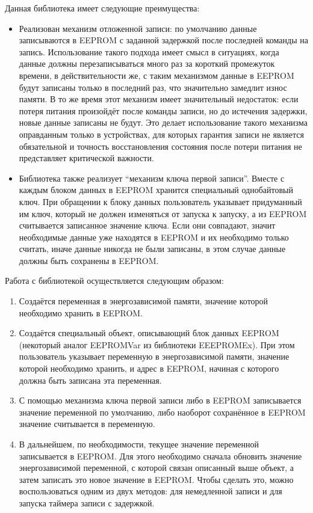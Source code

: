 Данная библиотека имеет следующие преимущества:
\begin{itemize}
	\item Реализован механизм отложенной записи: по умолчанию данные записываются в EEPROM с заданной задержкой после последней команды на запись. Использование такого подхода имеет смысл в ситуациях, когда данные должны перезаписываться много раз за короткий промежуток времени, в действительности же, с таким механизмом данные в EEPROM будут записаны только в последний раз, что значительно замедлит износ памяти. В то же время этот механизм имеет значительный недостаток: если потеря питания произойдёт после команды записи, но до истечения задержки, новые данные записаны не будут. Это делает использование такого механизма оправданным только в устройствах, для которых гарантия записи не является обязательной и точность восстановления состояния после потери питания не представляет критической важности.
	\item Библиотека также реализует "`механизм ключа первой записи"'. Вместе с каждым блоком данных в EEPROM хранится специальный однобайтовый ключ. При обращении к блоку данных пользователь указывает придуманный им ключ, который не должен изменяться от запуска к запуску, а из EEPROM считывается записанное значение ключа. Если они совпадают, значит необходимые данные уже находятся в EEPROM и их необходимо только считать, иначе данные никогда не были записаны, в этом случае данные должны быть сохранены в EEPROM.
\end{itemize}

Работа с библиотекой осуществляется следующим образом:
\begin{enumerate}
	\item Создаётся переменная в энергозависимой памяти, значение которой необходимо хранить в EEPROM.
	\item Создаётся специальный объект, описывающий блок данных EEPROM (некоторый аналог EEPROMVar из библиотеки EEEPROMEx). 
	При этом пользователь указывает переменную в энергозависимой памяти, значение которой  необходимо хранить, и адрес в EEPROM, начиная с которого должна быть записана эта переменная.
	\item С помощью механизма ключа первой записи либо в EEPROM записывается значение переменной по умолчанию, либо наоборот сохранённое в EEPROM значение считывается в переменную.
	\item В дальнейшем, по необходимости, текущее значение переменной записывается в EEPROM. 
	Для этого необходимо сначала обновить значение энергозависимой переменной, с которой связан описанный выше объект, а затем записать это новое значение в EEPROM.
	Чтобы сделать это, можно воспользоваться одним из двух методов: для немедленной записи и для запуска таймера записи с задержкой.
\end{enumerate}

